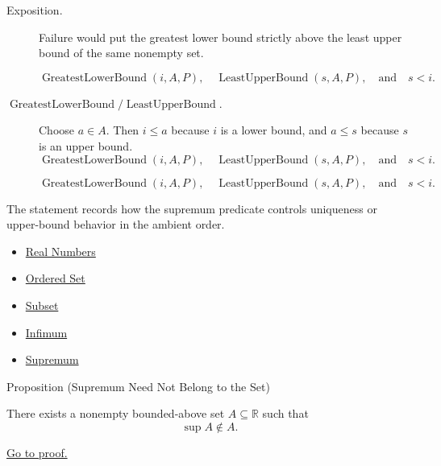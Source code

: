 \begin{remark*}
\begin{description}
  \item[Exposition.]
  Failure would put the greatest lower bound strictly above the least upper
  bound of the same nonempty set.

  
\[
\operatorname{GreatestLowerBound}(i,A,P),\quad \operatorname{LeastUpperBound}(s,A,P),
  \quad\text{and}\quad s<i.
\]
  \item[\(\operatorname{GreatestLowerBound} / \operatorname{LeastUpperBound}.\)]
  Choose $a\in A$.  Then $i\leq a$ because $i$ is a lower bound, and
  $a\leq s$ because $s$ is an upper bound.
  \[
    \operatorname{GreatestLowerBound}(i,A,P),\quad \operatorname{LeastUpperBound}(s,A,P),
    \quad\text{and}\quad s<i.
  \]

\[
    \operatorname{GreatestLowerBound}(i,A,P),\quad \operatorname{LeastUpperBound}(s,A,P),
    \quad\text{and}\quad s<i.
  \]
\end{description}
\end{remark*}

\begin{remark*}[Interpretation]
The statement records how the supremum predicate controls uniqueness or upper-bound behavior in the ambient order.
\end{remark*}

\begin{dependencies}
\begin{itemize}
  \item \hyperref[def:reals]{Real Numbers}
  \item \hyperref[def:ordered-set]{Ordered Set}
  \item \hyperref[def:subset]{Subset}
  \item \hyperref[def:infimum]{Infimum}
  \item \hyperref[def:supremum]{Supremum}
\end{itemize}
\end{dependencies}

\begin{propositionbox}{Proposition (Supremum Need Not Belong to the Set)}
\begin{proposition}
\label{prop:supremum-need-not-belong-to-the-set}
There exists a nonempty bounded-above set $A\subseteq\mathbb{R}$ such that
\[
  \sup A\notin A.
\]

\hyperref[prf:supremum-need-not-belong-to-the-set]{Go to proof.}
\end{proposition}
\end{propositionbox}

